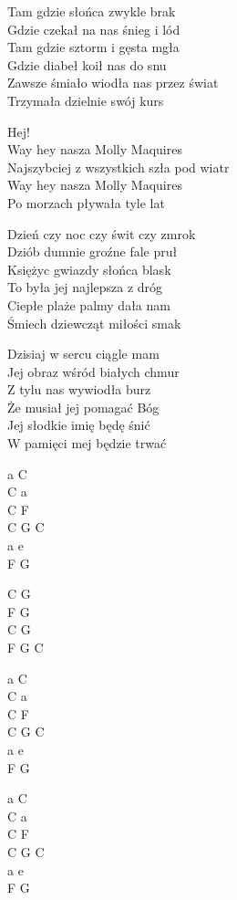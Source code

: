 \begin{text}
   
    Tam gdzie słońca zwykle brak\\ 
    Gdzie czekał na nas śnieg i lód\\ 
    Tam gdzie sztorm i gęsta mgła \\
    Gdzie diabeł koił nas do snu \\
    Zawsze śmiało wiodła nas przez świat \\
    Trzymała dzielnie swój kurs 

    \vin Hej!\\
    \vin Way hey nasza Molly Maquires\\ 
    \vin Najszybciej z wszystkich szła pod wiatr\\ 
    \vin Way hey nasza Molly Maquires \\
    \vin Po morzach pływała tyle lat 

    Dzień czy noc czy świt czy zmrok\\
    Dziób dumnie groźne fale pruł\\
    Księżyc gwiazdy słońca blask\\
    To była jej najlepsza z dróg\\
    Ciepłe plaże palmy dała nam\\
    Śmiech dziewcząt miłości smak

    Dzisiaj w sercu ciągle mam\\
    Jej obraz wśród białych chmur\\
    Z tylu nas wywiodła burz\\
    Że musiał jej pomagać Bóg\\
    Jej słodkie imię będę śnić\\
    W pamięci mej będzie trwać
   

\end{text}
\begin{chord}
    a C\\ 
    C a\\ 
    C F\\ 
    C G C\\ 
    a e\\ 
    F G
 
 \hfill\break %
    \vin C G\\ 
    \vin F G\\ 
    \vin C G\\ 
    \vin F G C 

    a C\\ 
    C a\\ 
    C F\\ 
    C G C\\ 
    a e\\ 
    F G
 
    a C\\ 
    C a\\ 
    C F\\ 
    C G C\\ 
    a e\\ 
    F G
\end{chord}